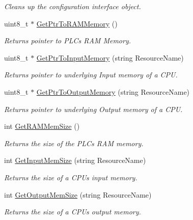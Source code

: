\begin{DoxyCompactItemize}
\begin{DoxyCompactList}\small\item\em Cleans up the configuration interface object. \end{DoxyCompactList}\item 
uint8\+\_\+t $\ast$ \hyperlink{classpc__emulator_1_1ExtModule_ab0a8708ed23abe9b74cec735b261485c}{Get\+Ptr\+To\+R\+A\+M\+Memory} ()\hypertarget{classpc__emulator_1_1ExtModule_ab0a8708ed23abe9b74cec735b261485c}{}\label{classpc__emulator_1_1ExtModule_ab0a8708ed23abe9b74cec735b261485c}

\begin{DoxyCompactList}\small\item\em Returns pointer to P\+LC\textquotesingle{}s R\+AM Memory. \end{DoxyCompactList}\item 
uint8\+\_\+t $\ast$ \hyperlink{classpc__emulator_1_1ExtModule_a6280ff246d649efd1f0cbfd5339416b7}{Get\+Ptr\+To\+Input\+Memory} (string Resource\+Name)
\begin{DoxyCompactList}\small\item\em Returns pointer to underlying Input memory of a C\+PU. \end{DoxyCompactList}\item 
uint8\+\_\+t $\ast$ \hyperlink{classpc__emulator_1_1ExtModule_a52155afa3e4b34a90306bff9935f8904}{Get\+Ptr\+To\+Output\+Memory} (string Resource\+Name)
\begin{DoxyCompactList}\small\item\em Returns pointer to underlying Output memory of a C\+PU. \end{DoxyCompactList}\item 
int \hyperlink{classpc__emulator_1_1ExtModule_ac18e032610e36cb0af1d8e3455b55012}{Get\+R\+A\+M\+Mem\+Size} ()\hypertarget{classpc__emulator_1_1ExtModule_ac18e032610e36cb0af1d8e3455b55012}{}\label{classpc__emulator_1_1ExtModule_ac18e032610e36cb0af1d8e3455b55012}

\begin{DoxyCompactList}\small\item\em Returns the size of the P\+LC\textquotesingle{}s R\+AM memory. \end{DoxyCompactList}\item 
int \hyperlink{classpc__emulator_1_1ExtModule_aef3ca6ce443502fbbc49970327718539}{Get\+Input\+Mem\+Size} (string Resource\+Name)
\begin{DoxyCompactList}\small\item\em Returns the size of a C\+PU\textquotesingle{}s input memory. \end{DoxyCompactList}\item 
int \hyperlink{classpc__emulator_1_1ExtModule_a90f876ee82a41bceaf2a1f49c89f7b6a}{Get\+Output\+Mem\+Size} (string Resource\+Name)
\begin{DoxyCompactList}\small\item\em Returns the size of a C\+PU\textquotesingle{}s output memory. \end{DoxyCompactList}\end{DoxyCompactItemize}
